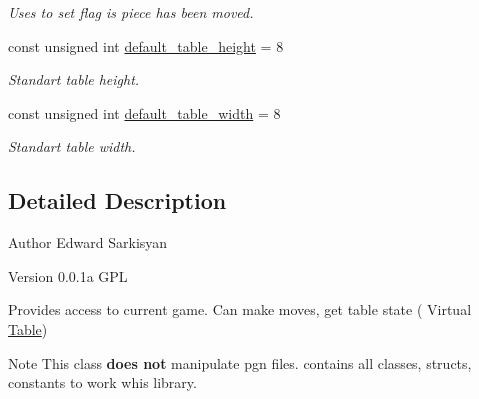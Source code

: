 \begin{DoxyCompactItemize}
\begin{DoxyCompactList}\small\item\em Uses to set flag is piece has been moved. \item\end{DoxyCompactList}\item 
\hypertarget{namespaceChEngn_ae87757a4f2d9ae9e25d48213cad79ddd}{
const unsigned int \hyperlink{namespaceChEngn_ae87757a4f2d9ae9e25d48213cad79ddd}{default\_\-table\_\-height} = 8}
\label{namespaceChEngn_ae87757a4f2d9ae9e25d48213cad79ddd}

\begin{DoxyCompactList}\small\item\em Standart table height. \item\end{DoxyCompactList}\item 
\hypertarget{namespaceChEngn_a9dc4a83c122aec6e170ad7a1d40efd8a}{
const unsigned int \hyperlink{namespaceChEngn_a9dc4a83c122aec6e170ad7a1d40efd8a}{default\_\-table\_\-width} = 8}
\label{namespaceChEngn_a9dc4a83c122aec6e170ad7a1d40efd8a}

\begin{DoxyCompactList}\small\item\em Standart table width. \item\end{DoxyCompactList}\end{DoxyCompactItemize}


\subsection{Detailed Description}
\begin{DoxyAuthor}{Author}
Edward Sarkisyan 
\end{DoxyAuthor}
\begin{DoxyVersion}{Version}
0.0.1a  GPL
\end{DoxyVersion}
Provides access to current game. Can make moves, get table state ( Virtual \hyperlink{classChEngn_1_1Table}{Table})

\begin{DoxyNote}{Note}
This class {\bfseries does not} manipulate pgn files. contains all classes, structs, constants to work whis library. 
\end{DoxyNote}


